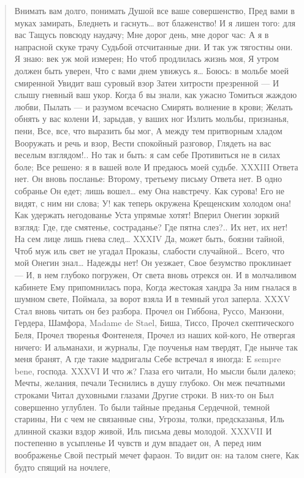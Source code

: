 \begin{verse}
Внимать вам долго, понимать
Душой все ваше совершенство,
Пред вами в муках замирать,
Бледнеть и гаснуть… вот блаженство!
И я лишен того: для вас
Тащусь повсюду наудачу;
Мне дорог день, мне дорог час:
А я в напрасной скуке трачу
Судьбой отсчитанные дни.
И так уж тягостны они.
Я знаю: век уж мой измерен;
Но чтоб продлилась жизнь моя,
Я утром должен быть уверен,
Что с вами днем увижусь я…
Боюсь: в мольбе моей смиренной
Увидит ваш суровый взор
Затеи хитрости презренной —
И слышу гневный ваш укор.
Когда б вы знали, как ужасно
Томиться жаждою любви,
Пылать — и разумом всечасно
Смирять волнение в крови;
Желать обнять у вас колени
И, зарыдав, у ваших ног
Излить мольбы, признанья, пени,
Все, все, что выразить бы мог,
А между тем притворным хладом
Вооружать и речь и взор,
Вести спокойный разговор,
Глядеть на вас веселым взглядом!..
Но так и быть: я сам себе
Противиться не в силах боле;
Все решено: я в вашей воле
И предаюсь моей судьбе.
XXXIII
Ответа нет. Он вновь посланье:
Второму, третьему письму
Ответа нет. В одно собранье
Он едет; лишь вошел… ему
Она навстречу. Как сурова!
Его не видят, с ним ни слова;
У! как теперь окружена
Крещенским холодом она!
Как удержать негодованье
Уста упрямые хотят!
Вперил Онегин зоркий взгляд:
Где, где смятенье, состраданье?
Где пятна слез?.. Их нет, их нет!
На сем лице лишь гнева след…
XXXIV
Да, может быть, боязни тайной,
Чтоб муж иль свет не угадал
Проказы, слабости случайной…
Всего, что мой Онегин знал…
Надежды нет! Он уезжает,
Свое безумство проклинает —
И, в нем глубоко погружен,
От света вновь отрекся он.
И в молчаливом кабинете
Ему припомнилась пора,
Когда жестокая хандра
За ним гналася в шумном свете,
Поймала, за ворот взяла
И в темный угол заперла.
XXXV
Стал вновь читать он без разбора.
Прочел он Гиббона, Руссо,
Манзони, Гердера, Шамфора,
Madame de Stael, Биша, Тиссо,
Прочел скептического Беля,
Прочел творенья Фонтенеля,
Прочел из наших кой-кого,
Не отвергая ничего:
И альманахи, и журналы,
Где поученья нам твердят,
Где нынче так меня бранят,
А где такие мадригалы
Себе встречал я иногда:
Е sempre bene, господа.
XXXVI
И что ж? Глаза его читали,
Но мысли были далеко;
Мечты, желания, печали
Теснились в душу глубоко.
Он меж печатными строками
Читал духовными глазами
Другие строки. В них-то он
Был совершенно углублен.
То были тайные преданья
Сердечной, темной старины,
Ни с чем не связанные сны,
Угрозы, толки, предсказанья,
Иль длинной сказки вздор живой,
Иль письма девы молодой.
XXXVII
И постепенно в усыпленье
И чувств и дум впадает он,
А перед ним воображенье
Свой пестрый мечет фараон.
То видит он: на талом снеге,
Как будто спящий на ночлеге,

\end{verse}
